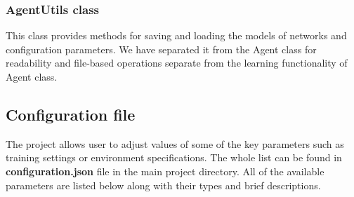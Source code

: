 \documentclass{article}
\begin{document}
\subsubsection{AgentUtils class}
This class provides methods for saving and loading the models of networks and configuration parameters. We have separated it from the Agent class for readability and file-based operations separate from the learning functionality of Agent class.

\subsection{Configuration file}
The project allows user to adjust values of some of the key parameters such as training settings or environment specifications. The whole list can be found in \textbf{configuration.json} file in the main project directory. All of the available parameters are listed below along with their types and brief descriptions.
\end{document}
